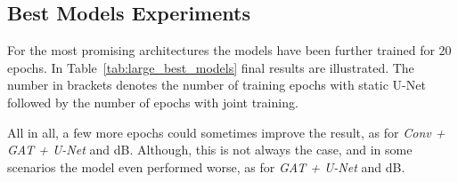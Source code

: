 \subsection{Best Models Experiments}
For the most promising architectures the models have been further trained for 20 epochs. 
In Table~\ref{tab:large_best_models} final results are illustrated. 
The number in brackets denotes the number of training epochs with static U-Net followed by
the number of epochs with joint training.

All in all, a few more epochs could sometimes improve the result, as for \textit{Conv + GAT + U-Net} and  dB.
Although, this is not always the case, and in some scenarios the model even performed worse, as for 
\textit{GAT + U-Net} and  dB.


\begin{table}[H]
  \centering
  \caption{Large Scale Experiment: Baseline results.}
  \label{tab:large_best_models}
\end{table}

